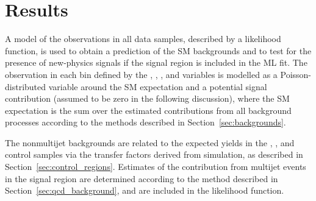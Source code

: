 \section{Results}
\label{sec:result}

A model of the observations in all data samples, described by a
likelihood function, is used to obtain a prediction of the SM
backgrounds and to test for the presence of new-physics signals if
the signal region is included in the ML fit. The
observation in each bin defined by the \njet, \nb, \scalht, and
\HTmiss variables is modelled as a Poisson-distributed variable around
the SM expectation and a potential signal contribution (assumed to be
zero in the following discussion), where the SM expectation is the sum
over the estimated contributions from all background processes
according to the methods described in Section~\ref{sec:backgrounds}.

The nonmultijet backgrounds 
are related to the expected yields in the \mj, \mmj, and \gj control
samples via the transfer factors derived from simulation, as described
in Section~\ref{sec:control_regions}.
Estimates of the contribution from multijet events in the signal
region are determined according to the method described in
Section~\ref{sec:qcd_background}, and are included in the likelihood
function.


